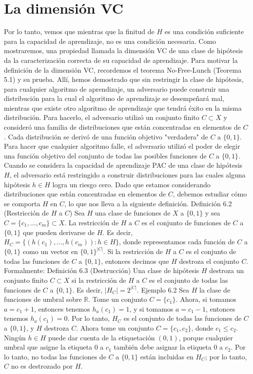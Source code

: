\section{La dimensión VC}
Por lo tanto, vemos que mientras que la finitud de $H$ es una condición suficiente para la capacidad de aprendizaje, no es una condición necesaria. Como mostraremos, una propiedad llamada la dimensión VC de una clase de hipótesis da la caracterización correcta de su capacidad de aprendizaje. Para motivar la definición de la dimensión VC, recordemos el teorema No-Free-Lunch (Teorema 5.1) y su prueba. Allí, hemos demostrado que sin restringir la clase de hipótesis, para cualquier algoritmo de aprendizaje, un adversario puede construir una distribución para la cual el algoritmo de aprendizaje se desempeñará mal, mientras que existe otro algoritmo de aprendizaje que tendrá éxito en la misma distribución. Para hacerlo, el adversario utilizó un conjunto finito $C \subset X$ y consideró una familia de distribuciones que están concentradas en elementos de $C$. Cada distribución se derivó de una función objetivo "verdadera" de $C$ a $\{0, 1\}$. Para hacer que cualquier algoritmo falle, el adversario utilizó el poder de elegir una función objetivo del conjunto de todas las posibles funciones de $C$ a $\{0, 1\}$.
Cuando se considera la capacidad de aprendizaje PAC de una clase de hipótesis $H$, el adversario está restringido a construir distribuciones para las cuales alguna hipótesis $h \in H$ logra un riesgo cero. Dado que estamos considerando distribuciones que están concentradas en elementos de $C$, debemos estudiar cómo se comporta $H$ en $C$, lo que nos lleva a la siguiente definición.
Definición 6.2 (Restricción de $H$ a $C$) Sea $H$ una clase de funciones de $X$ a $\{0, 1\}$ y sea $C = \{c_1, \ldots, c_m\} \subset X$. La restricción de $H$ a $C$ es el conjunto de funciones de $C$ a $\{0, 1\}$ que pueden derivarse de $H$. Es decir,
$H_C = \{(h(c_1), \ldots, h(c_m)) : h \in H\}$,
donde representamos cada función de $C$ a $\{0, 1\}$ como un vector en $\{0, 1\}^{|C|}$.
Si la restricción de $H$ a $C$ es el conjunto de todas las funciones de $C$ a $\{0, 1\}$, entonces decimos que $H$ destroza el conjunto $C$. Formalmente:
Definición 6.3 (Destrucción) Una clase de hipótesis $H$ destroza un conjunto finito $C \subset X$ si la restricción de $H$ a $C$ es el conjunto de todas las funciones de $C$ a $\{0, 1\}$. Es decir,
$|H_C| = 2^{|C|}$.
Ejemplo 6.2 Sea $H$ la clase de funciones de umbral sobre $\mathbb{R}$. Tome un conjunto $C = \{c_1\}$. Ahora, si tomamos $a = c_1 + 1$, entonces tenemos $h_a(c_1) = 1$, y si tomamos $a = c_1 - 1$, entonces tenemos $h_a(c_1) = 0$. Por lo tanto, $H_C$ es el conjunto de todas las funciones de $C$ a $\{0, 1\}$, y $H$ destroza $C$. Ahora tome un conjunto $C = \{c_1, c_2\}$, donde $c_1 \leq c_2$. Ningún $h \in H$ puede dar cuenta de la etiquetación $(0, 1)$, porque cualquier umbral que asigne la etiqueta $0$ a $c_1$ también debe asignar la etiqueta $0$ a $c_2$. Por lo tanto, no todas las funciones de $C$ a $\{0, 1\}$ están incluidas en $H_C$; por lo tanto, $C$ no es destrozado por $H$.
